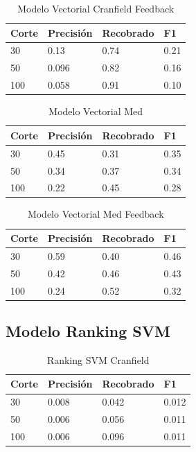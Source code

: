 \documentclass[runningheads]{llncs}
\begin{document}
\begin{table}
	\caption{Modelo Vectorial Cranfield Feedback}\label{cran_vec_feed_result}
 \begin{tabular}{|l|l|l|l|}
 \hline
 	Corte &  Precisión & Recobrado & F1\\
 \hline
	30 & 0.13 & 0.74 & 0.21\\
	50 & 0.096 & 0.82 & 0.16\\
	100 & 0.058 & 0.91 & 0.10\\
 \hline
 \end{tabular}
\end{table}


\begin{table}
	\caption{Modelo Vectorial Med}\label{med_vec_result}
 \begin{tabular}{|l|l|l|l|}
 \hline
 	Corte &  Precisión & Recobrado & F1\\
 \hline
	30 & 0.45 & 0.31 & 0.35\\
	50 & 0.34 & 0.37 & 0.34\\
	100 & 0.22 & 0.45 & 0.28\\
 \hline
 \end{tabular}
\end{table}


\begin{table}
	\caption{Modelo Vectorial Med Feedback}\label{med_vec_feed_result}
 \begin{tabular}{|l|l|l|l|}
 \hline
 	Corte &  Precisión & Recobrado & F1\\
 \hline
	30 & 0.59 & 0.40 & 0.46\\
	50 & 0.42 & 0.46 & 0.43\\
	100 & 0.24 & 0.52 & 0.32\\
 \hline
 \end{tabular}
\end{table}

\newpage

\subsection{Modelo Ranking SVM}


\begin{table}
	\caption{Ranking SVM Cranfield}\label{cran_svm_result}
 \begin{tabular}{|l|l|l|l|}
 \hline
 	Corte &  Precisión & Recobrado & F1\\
 \hline
	30 & 0.008 & 0.042 & 0.012\\
	50 & 0.006 & 0.056 & 0.011\\
	100 & 0.006 & 0.096 & 0.011\\
 \hline
 \end{tabular}
\end{table}
\end{document}
